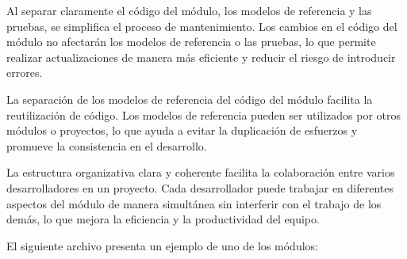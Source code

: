 Al separar claramente el código del módulo, los modelos de referencia y las pruebas, se simplifica el proceso de mantenimiento. Los cambios en el código del módulo no afectarán los modelos de referencia o las pruebas, lo que permite realizar actualizaciones de manera más eficiente y reducir el riesgo de introducir errores.

La separación de los modelos de referencia del código del módulo facilita la reutilización de código. Los modelos de referencia pueden ser utilizados por otros módulos o proyectos, lo que ayuda a evitar la duplicación de esfuerzos y promueve la consistencia en el desarrollo.

La estructura organizativa clara y coherente facilita la colaboración entre varios desarrolladores en un proyecto. Cada desarrollador puede trabajar en diferentes aspectos del módulo de manera simultánea sin interferir con el trabajo de los demás, lo que mejora la eficiencia y la productividad del equipo.

El siguiente archivo presenta un ejemplo de uno de los módulos:

